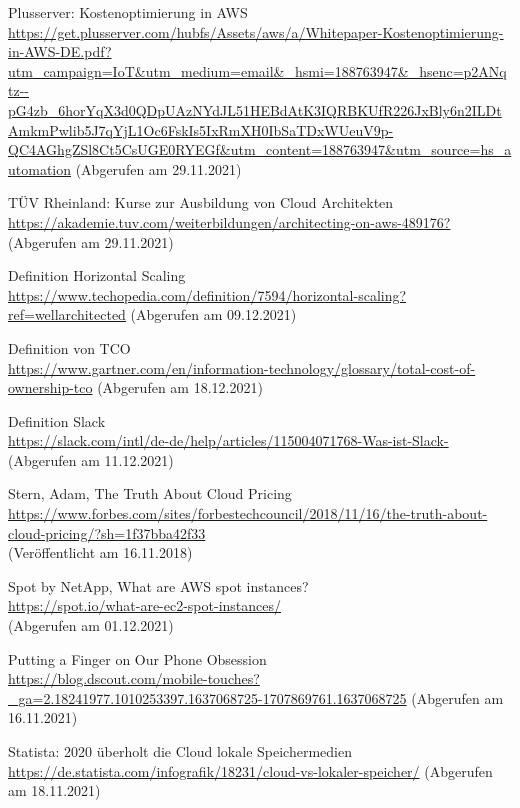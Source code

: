 \begin{thebibliography}{HR08}
  Plusserver: Kostenoptimierung in AWS\\
 \url{https://get.plusserver.com/hubfs/Assets/aws/a/Whitepaper-Kostenoptimierung-in-AWS-DE.pdf?utm_campaign=IoT&utm_medium=email&_hsmi=188763947&_hsenc=p2ANqtz--pG4zb_6horYqX3d0QDpUAzNYdJL51HEBdAtK3IQRBKUfR226JxBly6n2ILDtAmkmPwlib5J7qYjL1Oc6FskIs5IxRmXH0IbSaTDxWUeuV9p-QC4AGhgZSl8Ct5CsUGE0RYEGf&utm_content=188763947&utm_source=hs_automation}
 (Abgerufen am 29.11.2021)
 
  TÜV Rheinland: Kurse zur Ausbildung von Cloud Architekten\\
 \url{https://akademie.tuv.com/weiterbildungen/architecting-on-aws-489176?}
 (Abgerufen am 29.11.2021)

   Definition Horizontal Scaling\\
 \url{https://www.techopedia.com/definition/7594/horizontal-scaling?ref=wellarchitected}
 (Abgerufen am 09.12.2021)

  Definition von TCO\\
 \url{https://www.gartner.com/en/information-technology/glossary/total-cost-of-ownership-tco}
 (Abgerufen am 18.12.2021)

  Definition Slack\\
 \url{https://slack.com/intl/de-de/help/articles/115004071768-Was-ist-Slack-}
 (Abgerufen am 11.12.2021)

  Stern, Adam, The Truth About Cloud Pricing \\
  \url{https://www.forbes.com/sites/forbestechcouncil/2018/11/16/the-truth-about-cloud-pricing/?sh=1f37bba42f33}\\
  (Veröffentlicht am 16.11.2018)

 Spot by NetApp, What are AWS spot instances?\\
  \url{https://spot.io/what-are-ec2-spot-instances/}\\
  (Abgerufen am 01.12.2021)
  
    Putting a Finger on Our Phone Obsession\\
 \url{https://blog.dscout.com/mobile-touches?_ga=2.18241977.1010253397.1637068725-1707869761.1637068725}
 (Abgerufen am 16.11.2021)

    Statista: 2020 überholt die Cloud lokale Speichermedien\\
 \url{https://de.statista.com/infografik/18231/cloud-vs-lokaler-speicher/}
 (Abgerufen am 18.11.2021)


\end{thebibliography}
